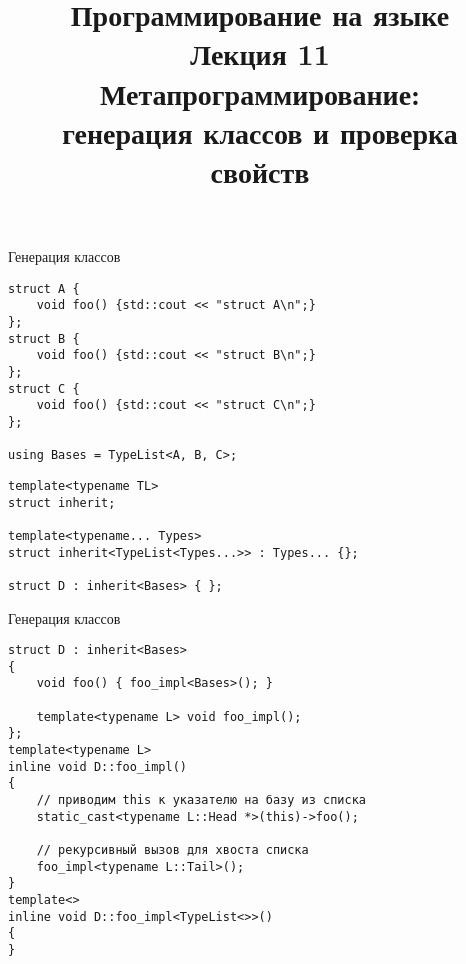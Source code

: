\documentclass[aspectration=1610,t]{beamer}
\title{{\bf Программирование на языке \langcpp\protect\\Лекция
11\protect\vspace{1em}\\}Метапрограммирование:\\ генерация классов и проверка свойств}
\begin{document}
\begin{frame} 
  \titlepage
\end{frame}


%
%
%

\begin{frame}[fragile]{Генерация классов}
\begin{lstlisting}
struct A { 
    void foo() {std::cout << "struct A\n";} 
};
struct B { 
    void foo() {std::cout << "struct B\n";} 
};
struct C { 
    void foo() {std::cout << "struct C\n";} 
};

using Bases = TypeList<A, B, C>;
\end{lstlisting}
\pause\begin{lstlisting}
template<typename TL>
struct inherit;

template<typename... Types>
struct inherit<TypeList<Types...>> : Types... {};

struct D : inherit<Bases> { };
\end{lstlisting}
\end{frame}


\begin{frame}[fragile]{Генерация классов}
\begin{lstlisting}
struct D : inherit<Bases> 
{
    void foo() { foo_impl<Bases>(); } 

    template<typename L> void foo_impl();
};
template<typename L> 
inline void D::foo_impl()
{
    // приводим this к указателю на базу из списка
    static_cast<typename L::Head *>(this)->foo();
    
    // рекурсивный вызов для хвоста списка
    foo_impl<typename L::Tail>();
}
template<> 
inline void D::foo_impl<TypeList<>>() 
{
}
\end{lstlisting}
\end{frame}
\end{document}
